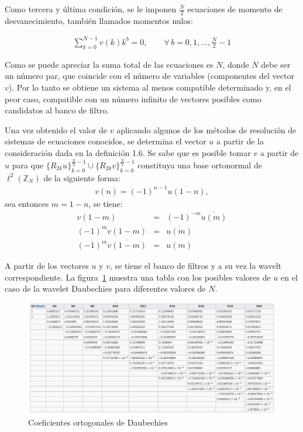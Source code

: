 \par Como tercera y \'ultima condici\'on, se le imponen $\frac{N}{2}$ ecuaciones de momento de desvanecimiento, tambi\'en llamados momentos nulos:

\begin{eqnarray}
\sum_{k=0}^{N-1}v(k)k^b=0,\qquad\forall\,b=0,1,...,\frac{N}{2}-1
\label{momento-nulo}
\end{eqnarray}

\par Como se puede apreciar la suma total de las ecuaciones es $N$, donde $N$ debe ser un n\'umero par, que coincide con el n\'umero de variables (componentes del vector $v$). Por lo tanto se obtiene un sistema al menos compatible determinado y, en el peor caso, compatible con un n\'umero infinito de vectores posibles como candidatos al banco de filtro.

\par Una vez obtenido el valor de $v$ aplicando algunos de los m\'etodos de resoluci\'on de sistemas de ecuaciones conocidos, se determina el vector $u$ a partir de la consideraci\'on dada en la definici\'on 1.6. Se sabe que es posible tomar $v$ a partir de $u$ para que $\{R_{2k}u\}_{k=0}^{\frac{N}{2}-1} \cup \{R_{2k}v\}_{k=0}^{\frac{N}{2}-1}$ constituya una base ortonormal de $\ell^2(\mathbb{Z}_N)$ de la siguiente forma:
\begin{eqnarray}
v(n)=(-1)^{n-1}\overline{u(1-n)},\nonumber
\end{eqnarray}
sea entonces $m=1-n$, se tiene:
\begin{eqnarray}
v(1-m)&=&(-1)^{-m}\overline{u(m)}\nonumber\\
(-1)^{m}v(1-m)&=&\overline{u(m)}\nonumber\\
(-1)^{m}\overline{v(1-m)}&=&u(m)\nonumber
\end{eqnarray}

\par A partir de los vectores $u$ y $v$, se tiene el banco de filtros y a su vez la wavelt correspondiente. La figura~\ref{coef-daubechies} muestra una tabla con los posibles valores de $u$ en el caso de la wavelet Daubechies para diferentes valores de $N$.

\begin{figure}[h]
\center
\includegraphics[scale=.35]{Graphics/Daubechies.png}
\caption{Coeficientes ortogonales de Daubechies}
\label{coef-daubechies}
\end{figure}

